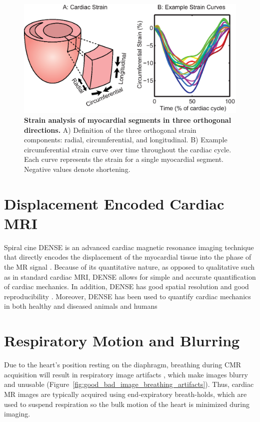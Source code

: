 	\begin{figure}
 		\centering
 		\includegraphics{figures/intro/3D_strain_explanation}
 		\caption[Strain analysis of myocardial segments in three orthogonal directions]{\textbf{Strain analysis of myocardial segments in three orthogonal directions.} A) Definition of the three orthogonal strain components: radial, circumferential, and longitudinal. B) Example circumferential strain curve over time throughout the cardiac cycle. Each curve represents the strain for a single myocardial segment. Negative values denote shortening.}
 		\label{fig:3D_strain_explanation}
 	\end{figure}

\section{Displacement Encoded Cardiac MRI}
	Spiral cine DENSE is an advanced cardiac magnetic resonance imaging technique that directly encodes the displacement of the myocardial tissue into the phase of the MR signal \cite{Aletras1999b}. Because of its quantitative nature, as opposed to qualitative such as in standard cardiac MRI, DENSE allows for simple and accurate quantification of cardiac mechanics. In addition, DENSE has good spatial resolution and good reproducibility \cite{Haggerty2013,Wehner2015a}. Moreover, DENSE has been used to quantify cardiac mechanics in both healthy and diseased animals and humans \cite{Aletras1999b,Aletras1999c,Kim2004,Ernande2012,Haggerty2013}

\section{Respiratory Motion and Blurring}
	Due to the heart's position resting on the diaphragm, breathing during CMR acquisition will result in respiratory image artifacts \cite{Axel1986}, which make images blurry and unusable (Figure~\ref{fig:good_bad_image_breathing_artifacts}). Thus, cardiac MR images are typically acquired using end-expiratory breath-holds, which are used to suspend respiration so the bulk motion of the heart is minimized during imaging.
	
